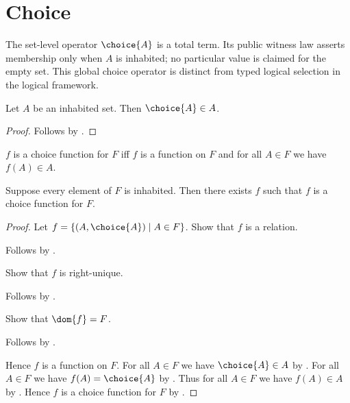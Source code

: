 \section{Choice}



The set-level operator $\choice{A}$ is a total term.  Its public witness law
asserts membership only when $A$ is inhabited; no particular value is claimed
for the empty set.  This global choice operator is distinct from typed logical
selection in the logical framework.

\begin{classification}\label{choice_in}
    Let $A$ be an inhabited set.
    Then $\choice{A}\in A$.
\end{classification}
\begin{proof}
    Follows by .
\end{proof}


\begin{definition}\label{choice_function}
    $f$ is a choice function for $F$ iff
        $f$ is a function on $F$ and
        for all $A\in F$ we have $f(A)\in A$.
\end{definition}


\begin{theorem}\label{choice_function_exists}
    Suppose every element of $F$ is inhabited.
    Then there exists $f$ such that $f$ is a choice function for $F$.
\end{theorem}
\begin{proof}
    Let $f=\{(A,\choice{A})\mid A\in F\}$.
    Show that $f$ is a relation.
    \begin{subproof}
        Follows by .
    \end{subproof}
    Show that $f$ is right-unique.
    \begin{subproof}
        Follows by .
    \end{subproof}
    Show that $\dom{f}=F$.
    \begin{subproof}
        Follows by .
    \end{subproof}
    Hence $f$ is a function on $F$.
    For all $A\in F$ we have $\choice{A}\in A$
        by .
    For all $A\in F$ we have $f(A)=\choice{A}$
        by .
    Thus for all $A\in F$ we have $f(A)\in A$ by \auto.
    Hence $f$ is a choice function for $F$ by .
\end{proof}



